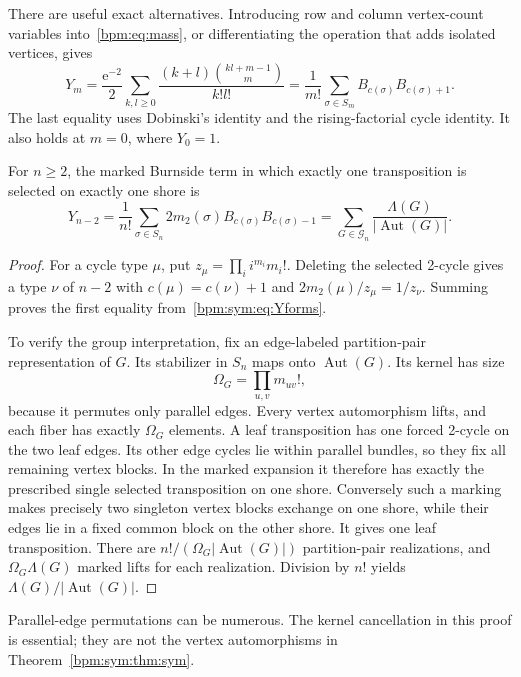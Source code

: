 \documentclass[11pt,a4paper]{article}
\theoremstyle{remark}\newtheorem{remark}[theorem]{Remark}%
\newcommand{\Aut}{\operatorname{Aut}}\newcommand{\ee}{\mathrm e}
\begin{document}
There are useful exact alternatives. Introducing row and column vertex-count variables into~\eqref{bpm:eq:mass}, or differentiating the operation that adds isolated vertices, gives
\begin{equation}\label{bpm:sym:eq:Yforms}
 Y_m=\frac{\ee^{-2}}2\sum_{k,l\ge0}
 \frac{(k+l)\binom{kl+m-1}{m}}{k!l!}
 =\frac1{m!}\sum_{\sigma\in S_m}B_{c(\sigma)}B_{c(\sigma)+1}.
\end{equation}
The last equality uses Dobinski's identity and the rising-factorial cycle identity. It also holds at $m=0$, where $Y_0=1$.

\begin{lemma}\label{bpm:sym:lem:markexact}
For $n\ge2$, the marked Burnside term in which exactly one transposition is selected on exactly one shore is
\begin{equation}\label{bpm:sym:eq:markexact}
 Y_{n-2}=\frac1{n!}\sum_{\sigma\in S_n}
       2m_2(\sigma)B_{c(\sigma)}B_{c(\sigma)-1}
 =\sum_{G\in\mathcal G_n}\frac{\Lambda(G)}{|\Aut(G)|}.
\end{equation}
\end{lemma}
\begin{proof}
For a cycle type $\mu$, put $z_\mu=\prod_i i^{m_i}m_i!$. Deleting the selected 2-cycle gives a type $\nu$ of $n-2$ with $c(\mu)=c(\nu)+1$ and $2m_2(\mu)/z_\mu=1/z_\nu$. Summing proves the first equality from~\eqref{bpm:sym:eq:Yforms}.

To verify the group interpretation, fix an edge-labeled partition-pair representation of $G$. Its stabilizer in $S_n$ maps onto $\Aut(G)$. Its kernel has size
\[
 \Omega_G=\prod_{u,v}m_{uv}!,
\]
because it permutes only parallel edges. Every vertex automorphism lifts, and each fiber has exactly $\Omega_G$ elements. A leaf transposition has one forced 2-cycle on the two leaf edges. Its other edge cycles lie within parallel bundles, so they fix all remaining vertex blocks. In the marked expansion it therefore has exactly the prescribed single selected transposition on one shore. Conversely such a marking makes precisely two singleton vertex blocks exchange on one shore, while their edges lie in a fixed common block on the other shore. It gives one leaf transposition. There are $n!/(\Omega_G|\Aut(G)|)$ partition-pair realizations, and $\Omega_G\Lambda(G)$ marked lifts for each realization. Division by $n!$ yields $\Lambda(G)/|\Aut(G)|$.
\end{proof}
Parallel-edge permutations can be numerous. The kernel cancellation in this proof is essential; they are not the vertex automorphisms in Theorem~\ref{bpm:sym:thm:sym}.
\end{document}
